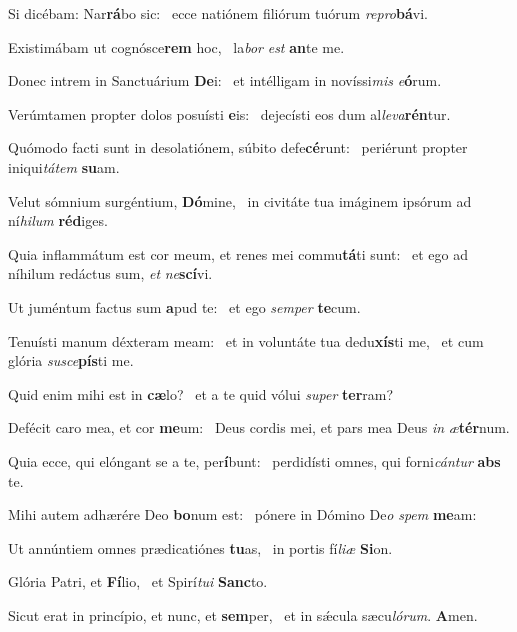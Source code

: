 \item Si dicébam: Nar\textbf{rá}bo sic:~\psstar{} ecce natiónem filiórum tuórum \textit{repro}\textbf{bá}vi.

\item Existimábam ut cognósce\textbf{rem} hoc,~\psstar{} la\textit{bor} \textit{est} \textbf{an}te me.

\item Donec intrem in Sanctuárium \textbf{De}i:~\psstar{} et intélligam in novíssi\textit{mis} \textit{e}\textbf{ó}rum.

\item Verúmtamen propter dolos posuísti \textbf{e}is:~\psstar{} dejecísti eos dum al\textit{leva}\textbf{rén}tur.

\item Quómodo facti sunt in desolatiónem, súbito defe\textbf{cé}runt:~\psstar{} periérunt propter iniqui\textit{tátem} \textbf{su}am.

\item Velut sómnium surgéntium, \textbf{Dó}mine,~\psstar{} in civitáte tua imáginem ipsórum ad ní\textit{hilum} \textbf{réd}iges.

\item Quia inflammátum est cor meum, et renes mei commu\textbf{tá}ti sunt:~\psstar{} et ego ad níhilum redáctus sum, \textit{et} \textit{ne}\textbf{scí}vi.

\item Ut juméntum factus sum \textbf{a}pud te:~\psstar{} et ego \textit{semper} \textbf{te}cum.

\item Tenuísti manum déxteram meam:~\pscross{} et in voluntáte tua dedu\textbf{xís}ti me,~\psstar{} et cum glória \textit{susce}\textbf{pís}ti me.

\item Quid enim mihi est in \textbf{cæ}lo?~\psstar{} et a te quid vólui \textit{super} \textbf{ter}ram?

\item Defécit caro mea, et cor \textbf{me}um:~\psstar{} Deus cordis mei, et pars mea Deus \textit{in} \textit{æ}\textbf{tér}num.

\item Quia ecce, qui elóngant se a te, per\textbf{í}bunt:~\psstar{} perdidísti omnes, qui forni\textit{cántur} \textbf{abs} te.

\item Mihi autem adhærére Deo \textbf{bo}num est:~\psstar{} pónere in Dómino De\textit{o} \textit{spem} \textbf{me}am:

\item Ut annúntiem omnes prædicatiónes \textbf{tu}as,~\psstar{} in portis fí\textit{liæ} \textbf{Si}on.

\item Glória Patri, et \textbf{Fí}lio,~\psstar{} et Spirí\textit{tui} \textbf{Sanc}to.

\item Sicut erat in princípio, et nunc, et \textbf{sem}per,~\psstar{} et in sǽcula sæcu\textit{lórum}. \textbf{A}men.
